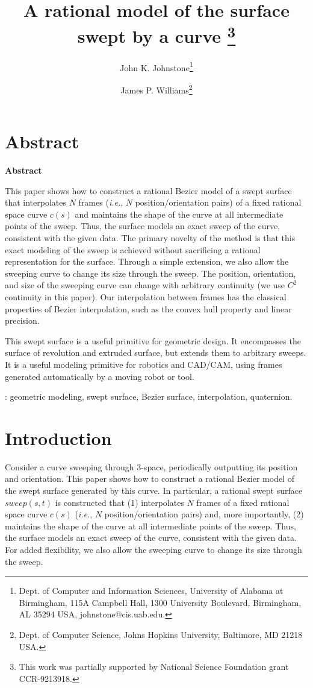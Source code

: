 \documentclass[times]{article}
\title{A rational model of the surface swept by a curve
        \thanks{This work was partially supported by 
	National Science Foundation grant CCR-9213918.}}
\author{John K. Johnstone\thanks{Dept. of Computer and Information Sciences,
	University of Alabama at Birmingham, 115A Campbell Hall,
	1300 University Boulevard, Birmingham, AL 35294 USA, 
	johnstone@cis.uab.edu.}
	\and James P. Williams\thanks{Dept. of Computer Science,
 	Johns Hopkins University, Baltimore, MD 21218 USA.}}
\makeatletter
\newenvironment{summary}[1]{\if@twocolumn
\section*{#1} \else
\begin{center}
{\bf #1\vspace{-.5em}\vspace{0pt}} 
\end{center}
\fi}{\if@twocolumn\fi}
\renewenvironment{abstract}{\begin{summary}{Abstract}}{\end{summary}}
\makeatother
\begin{document}
\maketitle
\thispagestyle{empty}
\begin{abstract}
This paper shows how to construct a rational Bezier model of a swept
surface that interpolates
$N$ frames ({\em i.e.}, $N$ position/orientation pairs)
of a fixed rational space curve $c(s)$ 
and maintains the shape of the curve at all intermediate points 
of the sweep.
Thus, the surface models
an exact sweep of the curve, consistent with the given data.
The primary novelty of the method is that 
this exact modeling of the sweep is achieved
without sacrificing a rational representation for the surface.
Through a simple extension, we also allow the sweeping curve to change
its size through the sweep.
The position, orientation, and size of the sweeping curve can change with
arbitrary continuity (we use $C^2$ continuity in this paper).
Our interpolation between frames has the classical properties
of Bezier interpolation, such as the convex hull property and linear precision.

This swept surface is a useful primitive for geometric design.
It encompasses the surface of revolution and extruded surface, but extends
them to arbitrary sweeps.
It is a useful modeling primitive for robotics and CAD/CAM, using frames generated
automatically by a moving robot or tool.
\end{abstract}

\vspace{.1in}

: geometric modeling, swept surface, Bezier surface,
	  interpolation, quaternion.

\section{Introduction}

Consider a curve sweeping through 3-space,
periodically outputting its position and orientation.
This paper shows how to construct a rational Bezier model of the swept
surface generated by this curve.
In particular, a rational swept surface $sweep(s,t)$ is constructed that 
(1) interpolates
$N$ frames of a fixed rational space curve $c(s)$ ({\em i.e.}, $N$ position/orientation pairs) 
and, more importantly, (2) maintains the shape of the curve at all intermediate points 
of the sweep.
Thus, the surface models 
an exact sweep of the curve, consistent with the given data.
For added flexibility, we also allow the sweeping curve to change its
size through the sweep.
\end{document}
